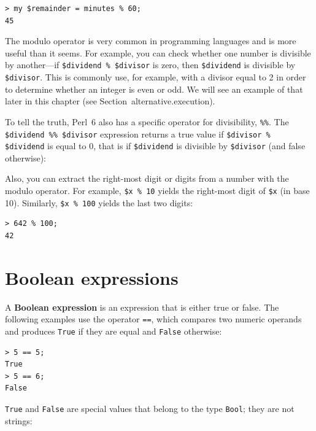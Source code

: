 \begin{verbatim}
> my $remainder = minutes % 60;
45
\end{verbatim}
%
The modulo operator is very common in programming languages
and is more useful than it seems.  For example, you can 
check whether one number is divisible by another---if 
{\tt \$dividend \% \$divisor} is zero, then {\tt \$dividend} 
is divisible by {\tt \$divisor}. This is commonly use, for 
example, with a divisor equal to 2 in order to determine 
whether an integer is even or odd. We will see an example 
of that later in this chapter (see Section~{alternative.execution}).

To tell the truth, Perl~6 also has a specific operator for 
divisibility, \verb"%%". The \verb'$dividend %% $divisor' 
expression returns a true value if
\verb'$divisor % $dividend' is equal to 0,  
that is if {\tt \$dividend} is divisible by {\tt \$divisor} (and false otherwise):

Also, you can extract the right-most digit
or digits from a number with the modulo operator.  For example, {\tt \$x \% 10} yields the
right-most digit of {\tt \$x} (in base 10).  Similarly, {\tt \$x \% 100}
yields the last two digits:

\begin{verbatim}
> 642 % 100;
42
\end{verbatim}
%



\section{Boolean expressions}

A {\bf Boolean expression} is an expression that is either true
or false.  The following examples use the operator {\tt ==}, 
which compares two numeric operands and produces
{\tt True} if they are equal and {\tt False} otherwise:

\begin{verbatim}
> 5 == 5;
True
> 5 == 6;
False
\end{verbatim}
%
{\tt True} and {\tt False} are special
values that belong to the type {\tt Bool}; they are not strings:

